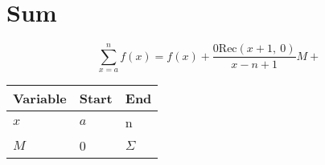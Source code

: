 \documentclass[11pt]{article}
\newcommand{\Rec}{\text{Rec}}
\begin{document}
    \section{Sum}\label{sec:sum}
    \[
        \sum_{x=a}^{n} f\left(x\right) =
        f(x) + \frac{0\Rec\left( x+1,~0\right)} {x - n+1} M+
    \]


    \begin{center}
    \begin{tabular}{|l|l|l|}
        \hline
        Variable & Start & End      \\
        \hline
        $x$      & $a$   & n        \\
        \hline
        $M$      & 0     & $\Sigma$ \\
        \hline
    \end{tabular}
    \end{center}
\end{document}
